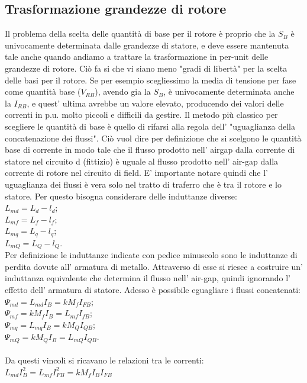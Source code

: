 \documentclass[Lau,noexaminfo]{sapthesis}
\begin{document}
	 \subsection{Trasformazione grandezze di rotore}
	 Il problema della scelta delle quantità di base per il rotore è proprio che la $S_B$ è univocamente determinata dalle grandezze di statore, e deve essere mantenuta tale anche quando andiamo a trattare la trasformazione in per-unit delle grandezze di rotore. Ciò fa si che vi siano meno "gradi di libertà" per la scelta delle basi per il rotore. Se per esempio scegliessimo la media di tensione per fase come quantità base ($V_{RB}$), avendo gia la $S_B$, è univocamente determinata anche la $I_{RB}$, e quest' ultima avrebbe un valore elevato, producendo dei valori delle correnti in p.u. molto piccoli e difficili da gestire. Il metodo più classico per scegliere le quantità di base è quello di rifarsi alla regola dell' "uguaglianza della concatenazione dei flussi". Ciò vuol dire per definizione che si scelgono le quantità base di corrente in modo tale che il flusso prodotto nell' airgap dalla corrente di statore nel circuito d (fittizio) è uguale al flusso prodotto nell' air-gap dalla corrente di rotore nel circuito di field. E' importante notare quindi che l' uguaglianza dei flussi è vera solo nel tratto di traferro che è tra il rotore e lo statore. Per questo bisogna considerare delle induttanze diverse:\\
	 $L_{md}=L_d-l_d$;\\
	 $L_{mf}=L_f-l_f$;\\
	 $L_{mq}=L_q-l_q$;\\
	 $L_{mQ}=L_Q-l_Q$.\\
	 Per definizione le induttanze indicate con pedice minuscolo sono le induttanze di perdita dovute all' armatura di metallo. Attraverso di esse si riesce a costruire un' induttanza equivalente che determina il flusso nell' air-gap, quindi ignorando l' effetto dell' armatura di statore. Adesso è possibile eguagliare i flussi concatenati:\\
	 $\Psi_{md}=L_{md}I_B=kM_f I_{FB}$;\\
	 $\Psi_{mf}=kM_fI_B=L_{mf}I_{fB}$;\\
	 $\Psi_{mq}=L_{mq}I_B=kM_QI_{QB}$;\\
	 $\Psi_{mQ}=kM_Q I_B=L_{mQ}I_{QB}$.\\\\
	 Da questi vincoli si ricavano le relazioni tra le correnti:\\
	 $L_{md} I_B^2=L_{mf}I_{FB}^2=kM_fI_BI_{FB}$\\
\end{document}
